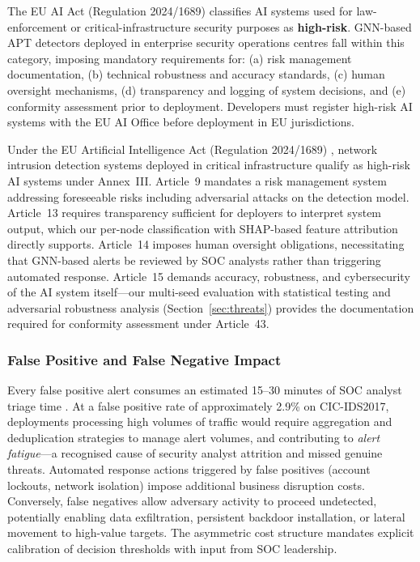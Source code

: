\documentclass[conference]{IEEEtran}
\begin{document}
The EU AI Act (Regulation 2024/1689) classifies AI systems used for
law-enforcement or critical-infrastructure security purposes as
\textbf{high-risk}. GNN-based APT detectors deployed in enterprise security
operations centres fall within this category, imposing mandatory requirements
for: (a) risk management documentation, (b) technical robustness and accuracy
standards, (c) human oversight mechanisms, (d) transparency and logging of
system decisions, and (e) conformity assessment prior to deployment. Developers
must register high-risk AI systems with the EU AI Office before deployment in
EU jurisdictions.

Under the EU Artificial Intelligence Act (Regulation 2024/1689)
\cite{euaiact2024}, network intrusion detection systems deployed in critical
infrastructure qualify as high-risk AI systems under Annex~III.
Article~9 mandates a risk management system addressing foreseeable risks
including adversarial attacks on the detection model. Article~13 requires
transparency sufficient for deployers to interpret system output, which our
per-node classification with SHAP-based feature attribution directly supports.
Article~14 imposes human oversight obligations, necessitating that GNN-based
alerts be reviewed by SOC analysts rather than triggering automated response.
Article~15 demands accuracy, robustness, and cybersecurity of the AI system
itself---our multi-seed evaluation with statistical testing and adversarial
robustness analysis (Section~\ref{sec:threats}) provides the documentation
required for conformity assessment under Article~43.

\subsubsection{False Positive and False Negative Impact}

Every false positive alert consumes an estimated 15--30 minutes of SOC analyst
triage time \cite{gamage2025}. At a false positive rate of approximately 2.9\%
on CIC-IDS2017, deployments processing high volumes of traffic would require
aggregation and deduplication strategies to manage alert volumes, and
contributing to \textit{alert fatigue}---a recognised cause of security
analyst attrition and missed genuine threats. Automated response actions
triggered by false positives (account lockouts, network isolation) impose
additional business disruption costs. Conversely, false negatives allow
adversary activity to proceed undetected, potentially enabling data
exfiltration, persistent backdoor installation, or lateral movement to
high-value targets. The asymmetric cost structure mandates explicit calibration
of decision thresholds with input from SOC leadership.
\end{document}
